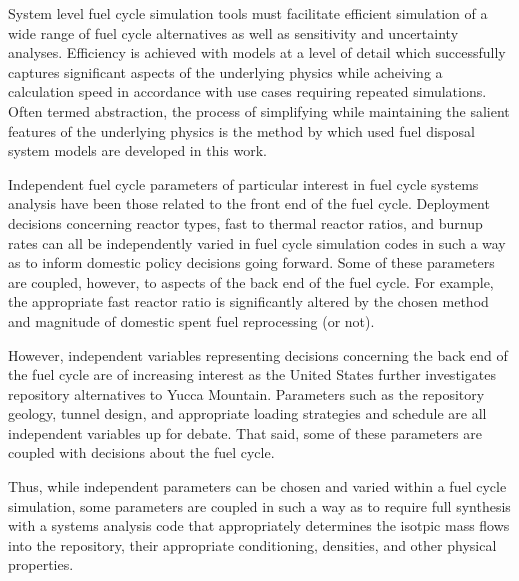 System level fuel cycle simulation tools must facilitate efficient 
simulation of a wide range of fuel cycle alternatives as well as 
sensitivity and uncertainty analyses. Efficiency is achieved with 
models at a level of detail which successfully captures significant 
aspects of the underlying physics while acheiving a calculation speed 
in accordance with use cases requiring repeated simulations. Often 
termed abstraction, the process of simplifying while maintaining the 
salient features of the underlying physics is the method by which used 
fuel disposal system models are developed in this work. 


Independent fuel cycle parameters of particular interest in fuel cycle systems 
analysis have been those related to the front end of the fuel cycle. Deployment 
decisions concerning reactor types, fast to thermal reactor ratios, and burnup 
rates can all be independently varied in fuel cycle simulation codes in such a 
way as to inform domestic policy decisions going forward. Some of these 
parameters are coupled, however, to aspects of the back end of the fuel cycle. 
For example, the appropriate fast reactor ratio is significantly altered by the 
chosen method and magnitude of domestic spent fuel reprocessing (or not).


However, independent variables representing decisions concerning the back end
of the fuel cycle are of increasing interest as the United States further
investigates repository alternatives to Yucca Mountain.  Parameters such as the
repository geology, tunnel design, and appropriate loading strategies and
schedule are all independent variables up for debate. That said, some of these
parameters are coupled with decisions about the fuel cycle. 


Thus, while independent parameters can be chosen and varied
within a fuel cycle simulation, some parameters are coupled in such a way as to
require full synthesis with a systems analysis code that appropriately
determines the isotpic mass flows into the repository, their appropriate
conditioning, densities, and other physical properties.  

